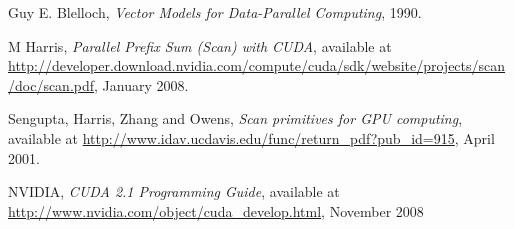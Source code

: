 
\begin{thebibliography}{99}

 Guy E. Blelloch, \emph{Vector Models for Data-Parallel Computing}, 1990.

 M Harris, \emph{Parallel Prefix Sum (Scan) with CUDA}, available at
\url{http://developer.download.nvidia.com/compute/cuda/sdk/website/projects/scan/doc/scan.pdf}, January 2008.

 Sengupta, Harris, Zhang and Owens, \emph{Scan primitives for GPU computing}, available at
\url{http://www.idav.ucdavis.edu/func/return_pdf?pub_id=915}, April 2001.

 NVIDIA, \emph{CUDA 2.1 Programming Guide}, available at
\url{http://www.nvidia.com/object/cuda_develop.html}, November 2008



\end{thebibliography}